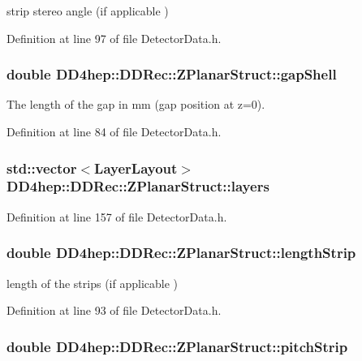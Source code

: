 strip stereo angle (if applicable ) 

Definition at line 97 of file DetectorData.h.\hypertarget{struct_d_d4hep_1_1_d_d_rec_1_1_z_planar_struct_a5136dbae308df17406ebd522459899ca}{
\subsubsection[{gapShell}]{\setlength{\rightskip}{0pt plus 5cm}double {\bf DD4hep::DDRec::ZPlanarStruct::gapShell}}}
\label{struct_d_d4hep_1_1_d_d_rec_1_1_z_planar_struct_a5136dbae308df17406ebd522459899ca}


The length of the gap in mm (gap position at z=0). 

Definition at line 84 of file DetectorData.h.\hypertarget{struct_d_d4hep_1_1_d_d_rec_1_1_z_planar_struct_ac310bd0aad67cbb00a15226520ca81f9}{
\subsubsection[{layers}]{\setlength{\rightskip}{0pt plus 5cm}std::vector$<${\bf LayerLayout}$>$ {\bf DD4hep::DDRec::ZPlanarStruct::layers}}}
\label{struct_d_d4hep_1_1_d_d_rec_1_1_z_planar_struct_ac310bd0aad67cbb00a15226520ca81f9}


Definition at line 157 of file DetectorData.h.\hypertarget{struct_d_d4hep_1_1_d_d_rec_1_1_z_planar_struct_ae17170e893c4b0a60f3757bffac7b3c9}{
\subsubsection[{lengthStrip}]{\setlength{\rightskip}{0pt plus 5cm}double {\bf DD4hep::DDRec::ZPlanarStruct::lengthStrip}}}
\label{struct_d_d4hep_1_1_d_d_rec_1_1_z_planar_struct_ae17170e893c4b0a60f3757bffac7b3c9}


length of the strips (if applicable ) 

Definition at line 93 of file DetectorData.h.\hypertarget{struct_d_d4hep_1_1_d_d_rec_1_1_z_planar_struct_a7367121d185ed521c9fff8bb437de11a}{
\subsubsection[{pitchStrip}]{\setlength{\rightskip}{0pt plus 5cm}double {\bf DD4hep::DDRec::ZPlanarStruct::pitchStrip}}}
\label{struct_d_d4hep_1_1_d_d_rec_1_1_z_planar_struct_a7367121d185ed521c9fff8bb437de11a}


